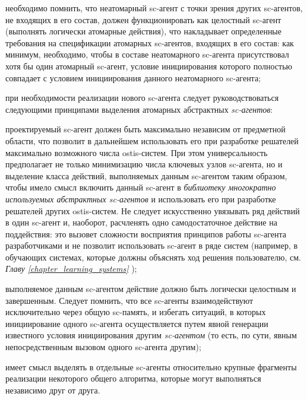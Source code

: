 \begin{textitemize}
\item необходимо помнить, что неатомарный sc-агент с точки зрения других sc-агентов, не входящих в его состав, должен функционировать как целостный sc-агент (выполнять логически атомарные действия), что накладывает определенные требования на спецификации атомарных sc-агентов, входящих в его состав: как минимум, необходимо, чтобы в составе неатомарного sc-агента присутствовал хотя бы один атомарный sc-агент, условие инициирования которого полностью совпадает с условием инициирования данного неатомарного sc-агента;
\item при необходимости реализации нового sc-агента следует руководствоваться следующими принципами выделения атомарных абстрактных \textit{sc-агентов}:

\begin{textitemize}
    \item проектируемый sc-агент должен быть максимально независим от предметной области, что позволит в дальнейшем использовать его при разработке решателей максимально возможного числа ostis-систем. При этом универсальность предполагает не только минимизацию числа ключевых узлов sc-агента, но и выделение класса действий, выполняемых данным sc-агентом таким образом, чтобы имело смысл включить данный sc-агент в \textit{библиотеку многократно используемых абстрактных sc-агентов} и использовать его при разработке решателей других ostis-систем. Не следует искусственно увязывать ряд действий в один sc-агент и, наоборот, расчленять одно самодостаточное действие на поддействия: это вызовет сложности восприятия принципов работы sc-агента разработчиками и не позволит использовать sc-агент в ряде систем (например, в обучающих системах, которые должны объяснять ход решения пользователю, см. \textit{Главу \ref{chapter_learning_systems} });
    \item выполняемое данным sc-агентом действие должно быть логически целостным и завершенным. Следует помнить, что все sc-агенты взаимодействуют исключительно через общую sc-память, и избегать ситуаций, в которых инициирование одного sc-агента осуществляется путем явной генерации известного условия инициирования другим \textit{sc-агентом} (то есть, по сути, явным непосредственным вызовом одного sc-агента другим);
    \item имеет смысл выделять в отдельные sc-агенты относительно крупные фрагменты реализации некоторого общего алгоритма, которые могут выполняться независимо друг от друга.
\end{textitemize}


\end{textitemize}
